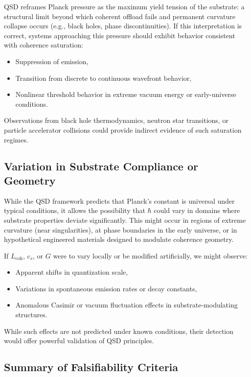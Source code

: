 \documentclass[ht-mathphys]{ht-fmt}
\theoremstyle{thmstyleone}%
\theoremstyle{thmstyletwo}%
\theoremstyle{thmstylethree}%
\begin{document}
QSD reframes Planck pressure as the maximum yield tension of the substrate: a structural limit beyond which coherent offload fails and permanent curvature collapse occurs (e.g., black holes, phase discontinuities). If this interpretation is correct, systems approaching this pressure should exhibit behavior consistent with coherence saturation:

\begin{itemize}
    \item Suppression of emission,
    \item Transition from discrete to continuous wavefront behavior,
    \item Nonlinear threshold behavior in extreme vacuum energy or early-universe conditions.
\end{itemize}

Observations from black hole thermodynamics, neutron star transitions, or particle accelerator collisions could provide indirect evidence of such saturation regimes.

\subsection{Variation in Substrate Compliance or Geometry}

While the QSD framework predicts that Planck’s constant is universal under typical conditions, it allows the possibility that $\hbar$ could vary in domains where substrate properties deviate significantly. This might occur in regions of extreme curvature (near singularities), at phase boundaries in the early universe, or in hypothetical engineered materials designed to modulate coherence geometry.

If $L_{\text{coh}}$, $c_s$, or $G$ were to vary locally or be modified artificially, we might observe:

\begin{itemize}
    \item Apparent shifts in quantization scale,
    \item Variations in spontaneous emission rates or decay constants,
    \item Anomalous Casimir or vacuum fluctuation effects in substrate-modulating structures.
\end{itemize}

While such effects are not predicted under known conditions, their detection would offer powerful validation of QSD principles.

\subsection{Summary of Falsifiability Criteria}
\end{document}
